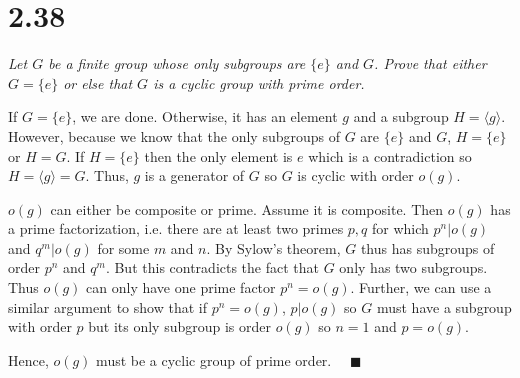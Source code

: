 \documentclass[12pt]{article}
\newcommand{\qed}{\quad \blacksquare}
\newcommand{\brak}[1]{\langle #1 \rangle}
\begin{document}
\section*{2.38}
\emph{Let $G$ be a finite group whose only subgroups are $\{e\}$ and $G$. Prove that either $G = \{e\}$ or else that $G$ is a cyclic group with prime order.}

\color{blue}
    If $G = \{e\}$, we are done. Otherwise, it has an element $g$ and a subgroup $H = \brak{g}$. However, because we know that the only subgroups of $G$ are $\{e\}$ and $G$, $H= \{e\}$ or $H = G$. If $H = \{e\}$ then the only element is $e$ which is a contradiction so $H =\brak{g} = G$. Thus, $g$ is a generator of $G$ so $G$ is cyclic with order $o(g)$. 

    $o(g)$ can either be composite or prime. Assume it is composite. Then $o(g)$ has a prime factorization, i.e. there are at least two primes $p, q$ for which $p^n | o(g)$ and $q^m | o(g)$ for some $m$ and $n$. By Sylow's theorem, $G$ thus has subgroups of order $p^n$ and $q^m$. But this contradicts the fact that $G$ only has two subgroups. Thus $o(g)$ can only have one prime factor $p^n = o(g)$. Further, we can use a similar argument to show that if $p^n = o(g)$, $p | o(g)$ so $G$ must have a subgroup with order $p$ but its only subgroup is order $o(g)$ so $n =1$ and $p = o(g)$. 
    
    Hence, $o(g)$ must be a cyclic group of prime order. $\qed$
\color{black}
\end{document}
